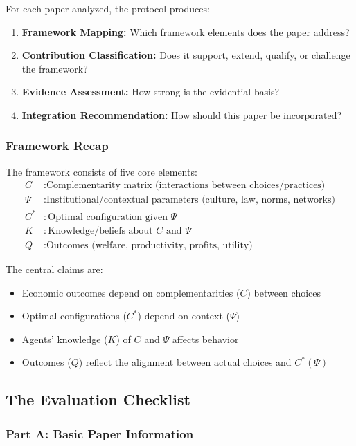 For each paper analyzed, the protocol produces:
\begin{enumerate}
  \item \textbf{Framework Mapping:} Which framework elements does the paper address?
  \item \textbf{Contribution Classification:} Does it support, extend, qualify, or challenge the framework?
  \item \textbf{Evidence Assessment:} How strong is the evidential basis?
  \item \textbf{Integration Recommendation:} How should this paper be incorporated?
\end{enumerate}

\subsubsection{Framework Recap}

The framework consists of five core elements:
\begin{align}
  C &: \text{Complementarity matrix (interactions between choices/practices)} \\
  \Psi &: \text{Institutional/contextual parameters (culture, law, norms, networks)} \\
  C^* &: \text{Optimal configuration given } \Psi \\
  K &: \text{Knowledge/beliefs about } C \text{ and } \Psi \\
  Q &: \text{Outcomes (welfare, productivity, profits, utility)}
\end{align}

The central claims are:
\begin{itemize}
  \item Economic outcomes depend on complementarities ($C$) between choices
  \item Optimal configurations ($C^*$) depend on context ($\Psi$)
  \item Agents' knowledge ($K$) of $C$ and $\Psi$ affects behavior
  \item Outcomes ($Q$) reflect the alignment between actual choices and $C^*(\Psi)$
\end{itemize}

\subsection{The Evaluation Checklist}

\subsubsection{Part A: Basic Paper Information}

